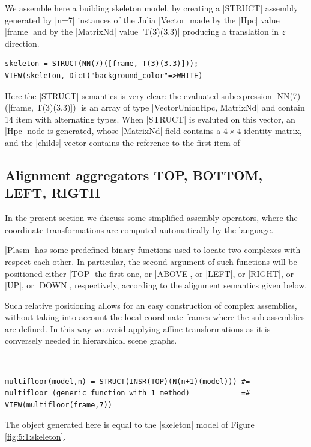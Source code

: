 \begin{coding}\label{5:1:skeleton}
We assemble here a building skeleton model, by creating a |STRUCT| assembly generated by |n=7| instances of the Julia |Vector| made by the |Hpc| value |frame| and by the |MatrixNd| value |T(3)(3.3)| producing a translation in $z$ direction.
\begin{lstlisting}[language=JuliaLocal, style=julia, mathescape=true]
skeleton = STRUCT(NN(7)([frame, T(3)(3.3)]));
VIEW(skeleton, Dict("background_color"=>WHITE)
\end{lstlisting}
\end{coding}

Here the |STRUCT| semantics is very clear: the evaluated subexpression |NN(7)([frame, T(3)(3.3)])| is an array of type |Vector{Union{Hpc, MatrixNd}}| and contain 14 item with alternating types.  When |STRUCT| is evaluted on this vector, an |Hpc| node is generated, whose |MatrixNd| field contains a $4\times 4$ identity matrix, and the |childs| vector contains the reference to the first item of 


\subsection*{Alignment aggregators {\sf TOP, BOTTOM, LEFT, RIGTH}}\label{sect:5-1-1}


In the present section we discuss some simplified assembly operators, where the
coordinate transformations are computed automatically by the language.

|Plasm| has some predefined binary functions used to locate two complexes with respect each other.  In particular,
the second argument of such functions will be positioned either
|TOP| the first one, or |ABOVE|, or |LEFT|, or
|RIGHT|, or |UP|, or |DOWN|, respectively,
according to the alignment semantics given below.

Such relative positioning allows
for an easy construction of complex assemblies, without taking into account the local coordinate frames where the
sub-assemblies are defined.  In this way we avoid applying affine transformations as it is
conversely needed in hierarchical scene graphs.

\begin{coding}\
\begin{lstlisting}[language=JuliaLocal, style=julia, mathescape=true]
multifloor(model,n) = STRUCT(INSR(TOP)(N(n+1)(model))) #=
multifloor (generic function with 1 method)		  	   =#
VIEW(multifloor(frame,7))
\end{lstlisting}
The object generated here is equal to the |skeleton| model of Figure \ref{fig:5:1:skeleton}. 
\end{coding}

